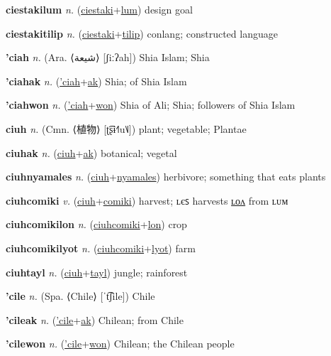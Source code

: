 \textbf{\hypertarget{ciestakilum}{ciestakilum}} \textit{n.} (\hyperlink{ciestaki}{ciestaki}+\allowbreak \hyperlink{lum}{lum})
design goal

\textbf{\hypertarget{ciestakitilip}{ciestakitilip}} \textit{n.} (\hyperlink{ciestaki}{ciestaki}+\allowbreak \hyperlink{tilip}{tilip})
conlang; constructed language

\textbf{\hypertarget{'ciah}{'ciah}} \textit{n.} (Ara. ⟨{\arabics{}شيعة‎}⟩ [ʃiːʔah])
Shia Islam; Shia

\textbf{\hypertarget{'ciahak}{'ciahak}} \textit{n.} (\hyperlink{'ciah}{'ciah}+\allowbreak \hyperlink{ak}{ak})
Shia; of Shia Islam

\textbf{\hypertarget{'ciahwon}{'ciahwon}} \textit{n.} (\hyperlink{'ciah}{'ciah}+\allowbreak \hyperlink{won}{won})
Shia of Ali; Shia; followers of Shia Islam

\textbf{\hypertarget{ciuh}{ciuh}} \textit{n.} (Cmn. ⟨{\chinese{}植物}⟩ [ʈ͡ʂɨ˧˥u˥˩])
plant; vegetable; Plantae

\textbf{\hypertarget{ciuhak}{ciuhak}} \textit{n.} (\hyperlink{ciuh}{ciuh}+\allowbreak \hyperlink{ak}{ak})
botanical; vegetal

\textbf{\hypertarget{ciuhnyamales}{ciuhnyamales}} \textit{n.} (\hyperlink{ciuh}{ciuh}+\allowbreak \hyperlink{nyamales}{nyamales})
herbivore; something that eats plants

\textbf{\hypertarget{ciuhcomiki}{ciuhcomiki}} \textit{v.} (\hyperlink{ciuh}{ciuh}+\allowbreak \hyperlink{comiki}{comiki})
harvest; ʟєꜱ harvests \hyperlink{ciuhcomikilon}{ʟᴏᴧ} from ʟᴜᴍ

\textbf{\hypertarget{ciuhcomikilon}{ciuhcomikilon}} \textit{n.} (\hyperlink{ciuhcomiki}{ciuhcomiki}+\allowbreak \hyperlink{lon}{lon})
crop

\textbf{\hypertarget{ciuhcomikilyot}{ciuhcomikilyot}} \textit{n.} (\hyperlink{ciuhcomiki}{ciuhcomiki}+\allowbreak \hyperlink{lyot}{lyot})
farm

\textbf{\hypertarget{ciuhtayl}{ciuhtayl}} \textit{n.} (\hyperlink{ciuh}{ciuh}+\allowbreak \hyperlink{tayl}{tayl})
jungle; rainforest

\textbf{\hypertarget{'cile}{'cile}} \textit{n.} (Spa. ⟨Chile⟩ [ˈt͡ʃile])
Chile

\textbf{\hypertarget{'cileak}{'cileak}} \textit{n.} (\hyperlink{'cile}{'cile}+\allowbreak \hyperlink{ak}{ak})
Chilean; from Chile

\textbf{\hypertarget{'cilewon}{'cilewon}} \textit{n.} (\hyperlink{'cile}{'cile}+\allowbreak \hyperlink{won}{won})
Chilean; the Chilean people

